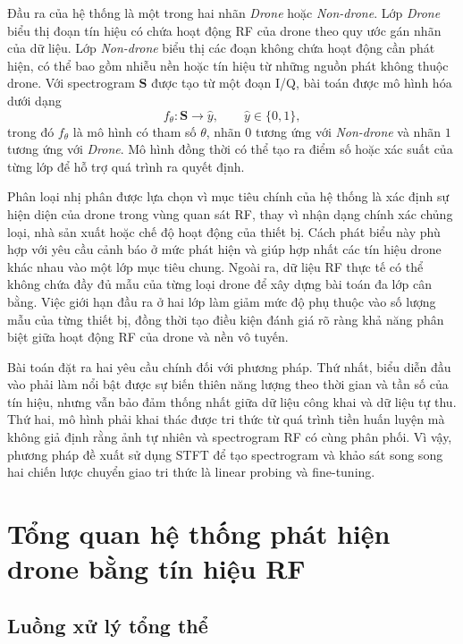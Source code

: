 \documentclass[../DoAn.tex]{subfiles}
\begin{document}
Đầu ra của hệ thống là một trong hai nhãn \textit{Drone} hoặc \textit{Non-drone}. Lớp \textit{Drone} biểu thị đoạn tín hiệu có chứa hoạt động RF của drone theo quy ước gán nhãn của dữ liệu. Lớp \textit{Non-drone} biểu thị các đoạn không chứa hoạt động cần phát hiện, có thể bao gồm nhiễu nền hoặc tín hiệu từ những nguồn phát không thuộc drone. Với spectrogram $\mathbf{S}$ được tạo từ một đoạn I/Q, bài toán được mô hình hóa dưới dạng
\begin{equation}
    f_{\theta}: \mathbf{S} \longrightarrow \hat{y}, 
    \qquad \hat{y}\in\{0,1\},
\end{equation}
trong đó $f_{\theta}$ là mô hình có tham số $\theta$, nhãn $0$ tương ứng với \textit{Non-drone} và nhãn $1$ tương ứng với \textit{Drone}. Mô hình đồng thời có thể tạo ra điểm số hoặc xác suất của từng lớp để hỗ trợ quá trình ra quyết định.

Phân loại nhị phân được lựa chọn vì mục tiêu chính của hệ thống là xác định sự hiện diện của drone trong vùng quan sát RF, thay vì nhận dạng chính xác chủng loại, nhà sản xuất hoặc chế độ hoạt động của thiết bị. Cách phát biểu này phù hợp với yêu cầu cảnh báo ở mức phát hiện và giúp hợp nhất các tín hiệu drone khác nhau vào một lớp mục tiêu chung. Ngoài ra, dữ liệu RF thực tế có thể không chứa đầy đủ mẫu của từng loại drone để xây dựng bài toán đa lớp cân bằng. Việc giới hạn đầu ra ở hai lớp làm giảm mức độ phụ thuộc vào số lượng mẫu của từng thiết bị, đồng thời tạo điều kiện đánh giá rõ ràng khả năng phân biệt giữa hoạt động RF của drone và nền vô tuyến.

Bài toán đặt ra hai yêu cầu chính đối với phương pháp. Thứ nhất, biểu diễn đầu vào phải làm nổi bật được sự biến thiên năng lượng theo thời gian và tần số của tín hiệu, nhưng vẫn bảo đảm thống nhất giữa dữ liệu công khai và dữ liệu tự thu. Thứ hai, mô hình phải khai thác được tri thức từ quá trình tiền huấn luyện mà không giả định rằng ảnh tự nhiên và spectrogram RF có cùng phân phối. Vì vậy, phương pháp đề xuất sử dụng STFT để tạo spectrogram và khảo sát song song hai chiến lược chuyển giao tri thức là linear probing và fine-tuning.

\section{Tổng quan hệ thống phát hiện drone bằng tín hiệu RF}

\subsection{Luồng xử lý tổng thể}
\end{document}
